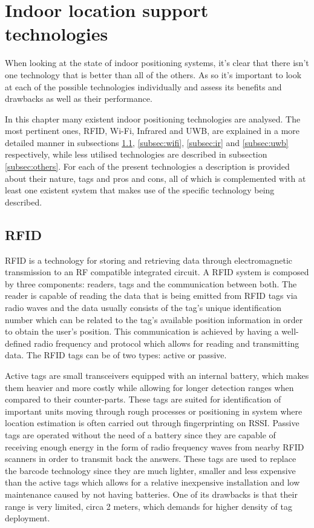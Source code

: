 \section{Indoor location support technologies}
\label{sec:indoortech}

When looking at the state of indoor positioning systems, it's clear that there isn't one technology that is better than all of the others. As so it's important to look at each of the possible technologies individually and assess its benefits and drawbacks as well as their performance.

In this chapter many existent indoor positioning technologies are analysed. The most pertinent ones, RFID, Wi-Fi, Infrared and UWB, are explained in a more detailed manner in subsections \ref{subsec:rfid}, \ref{subsec:wifi}, \ref{subsec:ir} and \ref{subsec:uwb} respectively, while less utilised technologies are described in subsection \ref{subsec:others}. For each of the present technologies a description is provided about their nature, tags and pros and cons, all of which is complemented with at least one existent system that makes use of the specific technology being described. 


\subsection{RFID}
\label{subsec:rfid}

\ac{RFID} is a technology for storing and retrieving data through electromagnetic transmission to an RF compatible integrated circuit. A \ac{RFID} system is composed by three components: readers, tags and the communication between both. The reader is capable of reading the data that is being emitted from \ac{RFID} tags via radio waves and the data usually consists of the tag's unique identification number which can be related to the tag's available position information in order to obtain the user's position. This communication is achieved by having a well-defined radio frequency and protocol which allows for reading and transmitting data. The \ac{RFID} tags can be of two types: active or passive.

Active tags are small transceivers equipped with an internal battery, which makes them heavier and more costly while allowing for longer detection ranges when compared to their counter-parts. These tags are suited for identification of important units moving through rough processes or positioning in system where location estimation is often carried out through fingerprinting on \ac{RSSI}.
Passive tags are operated without the need of a battery since they are capable of receiving enough energy in the form of radio frequency waves from nearby \ac{RFID} scanners in order to transmit back the answers. These tags are used to replace the barcode technology since they are much lighter, smaller and less expensive than the active tags which allows for a relative inexpensive installation and low maintenance caused by not having batteries. One of its drawbacks is that their range is very limited, circa 2 meters, which demands for higher density of tag deployment.

